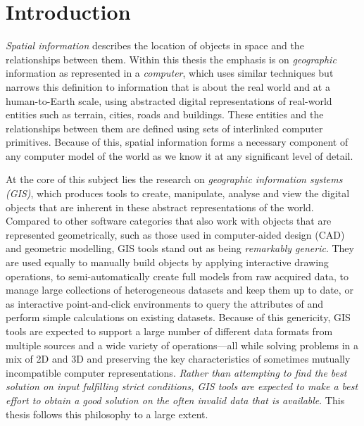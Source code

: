 
\chapter{Introduction}
\label{ch:introduction}


\emph{Spatial information} describes the location of objects in space and the relationships between them.
Within this thesis the emphasis is on \emph{geographic} information as represented in a \emph{computer}, which uses similar techniques but narrows this definition to information that is about the real world and at a human-to-Earth scale, using abstracted digital representations of real-world entities such as terrain, cities, roads and buildings.
These entities and the relationships between them are defined using sets of interlinked computer primitives.
Because of this, spatial information forms a necessary component of any computer model of the world as we know it at any significant level of detail.


At the core of this subject lies the research on \emph{geographic information systems (GIS)}, which produces tools to create, manipulate, analyse and view the digital objects that are inherent in these abstract representations of the world.
Compared to other software categories that also work with objects that are represented geometrically, such as those used in computer-aided design (CAD) and geometric modelling, GIS tools stand out as being \emph{remarkably generic}.
They are used equally to manually build objects by applying interactive drawing operations, to semi-automatically create full models from raw acquired data, to manage large collections of heterogeneous datasets and keep them up to date, or as interactive point-and-click environments to query the attributes of and perform simple calculations on existing datasets.
Because of this genericity, GIS tools are expected to support a large number of different data formats from multiple sources and a wide variety of operations---all while solving problems in a mix of 2D and 3D and preserving the key characteristics of sometimes mutually incompatible computer representations.
\emph{Rather than attempting to find the best solution on input fulfilling strict conditions, GIS tools are expected to make a best effort to obtain a good solution on the often invalid data that is available}.
This thesis follows this philosophy to a large extent.

